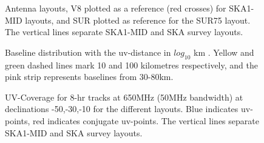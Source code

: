 \documentclass[sfheadings,a4paper,times,9pt,floats,floatfix]{article}
\begin{document}
\begin{figure}[H]
 \tiny{}
 \caption{Antenna layouts, V8 plotted as a reference (red crosses) for SKA1-MID layouts, and SUR
plotted as reference for the SUR75 layout. The vertical lines separate SKA1-MID and SKA
survey layouts.}\label{fig:lay}
\end{figure}
\begin{figure}[H]
 \tiny{}
 \caption{Baseline distribution with the uv-distance in $log_{10}$ km . Yellow and green dashed lines mark 10 and 100
kilometres respectively, and the pink strip represents baselines from 30-80km.}\label{fig:hist}
\end{figure}
%  
%  
\begin{figure}[H]
 \tiny{}
 \caption{UV-Coverage for 8-hr tracks at 650MHz (50MHz bandwidth) at declinations -50,-30,-10 for the different layouts. Blue
indicates uv-points, red indicates conjugate uv-points. The vertical lines separate SKA1-MID and SKA
survey layouts.}\label{fig:uvcov}
\end{figure}
\end{document}
